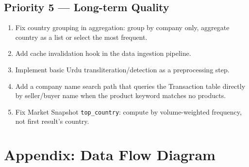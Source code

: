 \documentclass[12pt,a4paper]{article}
\begin{document}
\subsection{Priority 5 --- Long-term Quality}

\begin{enumerate}
  \item Fix country grouping in aggregation: group by company only, aggregate
        country as a list or select the most frequent.
  \item Add cache invalidation hook in the data ingestion pipeline.
  \item Implement basic Urdu transliteration/detection as a preprocessing step.
  \item Add a company name search path that queries the Transaction table directly
        by seller/buyer name when the product keyword matches no products.
  \item Fix Market Snapshot \texttt{top\_country}: compute by
        volume-weighted frequency, not first result's country.
\end{enumerate}

\section{Appendix: Data Flow Diagram}
\end{document}

